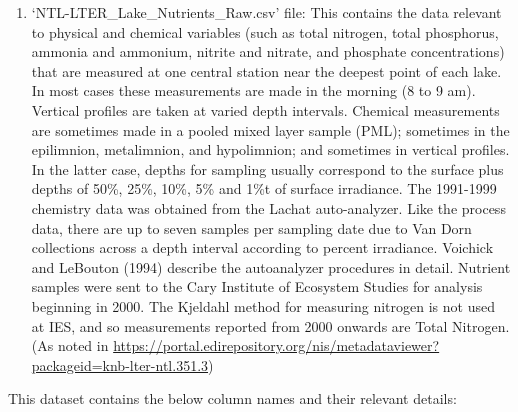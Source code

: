 \documentclass[12pt,]{article}
\providecommand{\tightlist}{%
  \setlength{\itemsep}{0pt}\setlength{\parskip}{0pt}}
\begin{document}
\begin{enumerate}
\def\labelenumi{\arabic{enumi}.}
\setcounter{enumi}{1}
\tightlist
\item
  `NTL-LTER\_Lake\_Nutrients\_Raw.csv' file: This contains the data
  relevant to physical and chemical variables (such as total nitrogen,
  total phosphorus, ammonia and ammonium, nitrite and nitrate, and
  phosphate concentrations) that are measured at one central station
  near the deepest point of each lake. In most cases these measurements
  are made in the morning (8 to 9 am). Vertical profiles are taken at
  varied depth intervals. Chemical measurements are sometimes made in a
  pooled mixed layer sample (PML); sometimes in the epilimnion,
  metalimnion, and hypolimnion; and sometimes in vertical profiles. In
  the latter case, depths for sampling usually correspond to the surface
  plus depths of 50\%, 25\%, 10\%, 5\% and 1\%t of surface irradiance.
  The 1991-1999 chemistry data was obtained from the Lachat
  auto-analyzer. Like the process data, there are up to seven samples
  per sampling date due to Van Dorn collections across a depth interval
  according to percent irradiance. Voichick and LeBouton (1994) describe
  the autoanalyzer procedures in detail. Nutrient samples were sent to
  the Cary Institute of Ecosystem Studies for analysis beginning in
  2000. The Kjeldahl method for measuring nitrogen is not used at IES,
  and so measurements reported from 2000 onwards are Total Nitrogen. (As
  noted in
  \url{https://portal.edirepository.org/nis/metadataviewer?packageid=knb-lter-ntl.351.3})
\end{enumerate}

This dataset contains the below column names and their relevant details:
\end{document}
